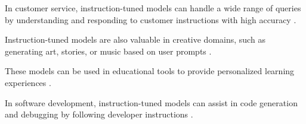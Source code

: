 In customer service, instruction-tuned models can handle a wide range of queries by understanding and responding to customer instructions with high accuracy \cite{OpenAICommunity}.

Instruction-tuned models are also valuable in creative domains, such as generating art, stories, or music based on user prompts \cite{RohitAggarwal}.

These models can be used in educational tools to provide personalized learning experiences \cite{RedditExperience}.

In software development, instruction-tuned models can assist in code generation and debugging by following developer instructions \cite{RohitAggarwal}.


